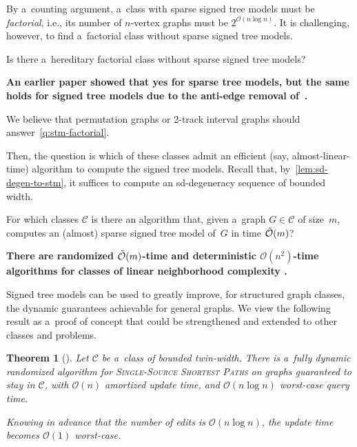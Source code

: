 \documentclass[a4paper,11pt]{article}
\newcommand{\Oh}{\mathcal{O}}
\newtheorem{solved-quest}[quest]{Question}
\newenvironment{solved-question}
  {\begin{solved-quest}\begin{mdframed}[style=solvedquestionstyle]}
  {\end{mdframed}\end{solved-quest}}
\newtheorem{theorem}{Theorem}
\begin{document}
\medskip

By a~counting argument, a~class with sparse signed tree models must be \emph{factorial}, i.e., its number of $n$-vertex graphs must be $2^{\Oh(n \log n)}$.
It is challenging, however, to find a~factorial class without sparse signed tree models.

\begin{solved-question}\label{q:stm-factorial}
  Is there a~hereditary factorial class without sparse signed tree models?
\end{solved-question}

\textbf{An earlier paper \cite{BannachMT24} showed that yes for sparse tree models, but the same holds for signed tree models due to the anti-edge removal of~\cite{BonnetGKM26}.}

\medskip

We believe that permutation graphs or 2-track interval graphs should answer~\cref{q:stm-factorial}.

Then, the question is which of these classes admit an efficient (say, almost-linear-time) algorithm to compute the signed tree models.
Recall that, by~\cref{lem:sd-degen-to-stm}, it suffices to compute an sd-degeneracy sequence of bounded width.

\begin{solved-question}\label{q:eff-stm}
  For which classes $\mathcal C$ is there an algorithm that, given a~graph $G \in \mathcal C$ of size~$m$, computes an (almost) sparse signed tree model of~$G$ in time $\Tilde{\Oh}(m)$?
\end{solved-question}

\textbf{There are randomized $\Tilde{\Oh}(m)$-time and deterministic $\Oh(n^2)$-time algorithms for classes of linear neighborhood complexity \cite{BonnetDPST26}.}

\medskip

Signed tree models can be used to greatly improve, for structured graph classes, the dynamic guarantees achievable for general graphs.
We view the following result as a~proof of concept that could be strengthened and extended to other classes and problems.

\begin{theorem}[\cite{BonnetGKM26}]\label{thm:tww-dynamic-sssp}
  Let $\mathcal C$ be a~class of bounded twin-width.
  There is a~fully dynamic randomized algorithm for \textsc{Single-Source Shortest Paths} on graphs guaranteed to stay in $\mathcal C$, with $\Oh(n)$ amortized update time, and $\Oh(n \log n)$ worst-case query time.

  Knowing in advance that the number of edits is $\Oh(n \log n)$, the update time becomes $\Oh(1)$ worst-case.
\end{theorem}

%
%



\end{document}
